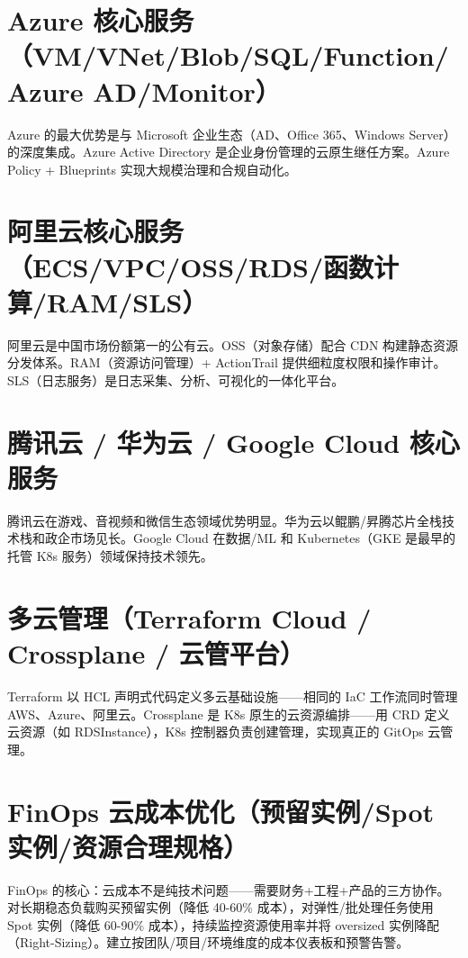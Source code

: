 \documentclass[12pt,UTF8]{ctexbook}
\begin{document}
  \section{Azure 核心服务（VM/VNet/Blob/SQL/Function/Azure AD/Monitor）}

Azure 的最大优势是与 Microsoft 企业生态（AD、Office 365、Windows Server）的深度集成。Azure Active Directory 是企业身份管理的云原生继任方案。Azure Policy + Blueprints 实现大规模治理和合规自动化。

  \section{阿里云核心服务（ECS/VPC/OSS/RDS/函数计算/RAM/SLS）}

阿里云是中国市场份额第一的公有云。OSS（对象存储）配合 CDN 构建静态资源分发体系。RAM（资源访问管理）+ ActionTrail 提供细粒度权限和操作审计。SLS（日志服务）是日志采集、分析、可视化的一体化平台。

  \section{腾讯云 / 华为云 / Google Cloud 核心服务}

腾讯云在游戏、音视频和微信生态领域优势明显。华为云以鲲鹏/昇腾芯片全栈技术栈和政企市场见长。Google Cloud 在数据/ML 和 Kubernetes（GKE 是最早的托管 K8s 服务）领域保持技术领先。

  \section{多云管理（Terraform Cloud / Crossplane / 云管平台）}

Terraform 以 HCL 声明式代码定义多云基础设施——相同的 IaC 工作流同时管理 AWS、Azure、阿里云。Crossplane 是 K8s 原生的云资源编排——用 CRD 定义云资源（如 RDSInstance），K8s 控制器负责创建管理，实现真正的 GitOps 云管理。

  \section{FinOps 云成本优化（预留实例/Spot 实例/资源合理规格）}

FinOps 的核心：云成本不是纯技术问题——需要财务+工程+产品的三方协作。对长期稳态负载购买预留实例（降低 40-60\% 成本），对弹性/批处理任务使用 Spot 实例（降低 60-90\% 成本），持续监控资源使用率并将 oversized 实例降配（Right-Sizing）。建立按团队/项目/环境维度的成本仪表板和预警告警。

\end{document}
